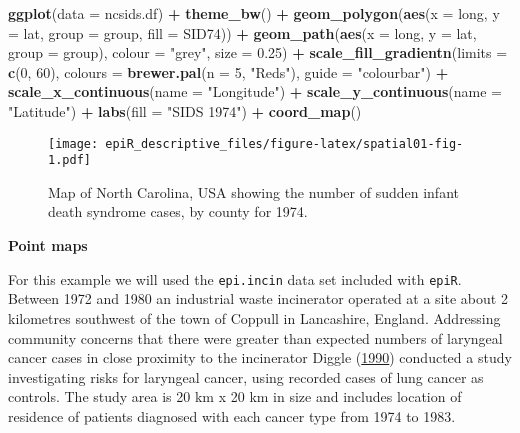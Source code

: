 \documentclass[
]{article}
\newenvironment{Shaded}{\begin{snugshade}}{\end{snugshade}}
\newcommand{\DataTypeTok}[1]{\textcolor[rgb]{0.13,0.29,0.53}{#1}}
\newcommand{\DecValTok}[1]{\textcolor[rgb]{0.00,0.00,0.81}{#1}}
\newcommand{\FloatTok}[1]{\textcolor[rgb]{0.00,0.00,0.81}{#1}}
\newcommand{\KeywordTok}[1]{\textcolor[rgb]{0.13,0.29,0.53}{\textbf{#1}}}
\newcommand{\NormalTok}[1]{#1}
\newcommand{\OperatorTok}[1]{\textcolor[rgb]{0.81,0.36,0.00}{\textbf{#1}}}
\newcommand{\StringTok}[1]{\textcolor[rgb]{0.31,0.60,0.02}{#1}}
\begin{document}
\begin{Shaded}
\begin{Highlighting}[]

\KeywordTok{ggplot}\NormalTok{(}\DataTypeTok{data =}\NormalTok{ ncsids.df) }\OperatorTok{+}\StringTok{ }
\StringTok{  }\KeywordTok{theme\_bw}\NormalTok{() }\OperatorTok{+}
\StringTok{  }\KeywordTok{geom\_polygon}\NormalTok{(}\KeywordTok{aes}\NormalTok{(}\DataTypeTok{x =}\NormalTok{ long, }\DataTypeTok{y =}\NormalTok{ lat, }\DataTypeTok{group =}\NormalTok{ group, }\DataTypeTok{fill =}\NormalTok{ SID74)) }\OperatorTok{+}\StringTok{ }
\StringTok{  }\KeywordTok{geom\_path}\NormalTok{(}\KeywordTok{aes}\NormalTok{(}\DataTypeTok{x =}\NormalTok{ long, }\DataTypeTok{y =}\NormalTok{ lat, }\DataTypeTok{group =}\NormalTok{ group), }\DataTypeTok{colour =} \StringTok{"grey"}\NormalTok{, }\DataTypeTok{size =} \FloatTok{0.25}\NormalTok{) }\OperatorTok{+}
\StringTok{  }\KeywordTok{scale\_fill\_gradientn}\NormalTok{(}\DataTypeTok{limits =} \KeywordTok{c}\NormalTok{(}\DecValTok{0}\NormalTok{, }\DecValTok{60}\NormalTok{), }\DataTypeTok{colours =} \KeywordTok{brewer.pal}\NormalTok{(}\DataTypeTok{n =} \DecValTok{5}\NormalTok{, }\StringTok{"Reds"}\NormalTok{), }
     \DataTypeTok{guide =} \StringTok{"colourbar"}\NormalTok{) }\OperatorTok{+}
\StringTok{  }\KeywordTok{scale\_x\_continuous}\NormalTok{(}\DataTypeTok{name =} \StringTok{"Longitude"}\NormalTok{) }\OperatorTok{+}
\StringTok{  }\KeywordTok{scale\_y\_continuous}\NormalTok{(}\DataTypeTok{name =} \StringTok{"Latitude"}\NormalTok{) }\OperatorTok{+}
\StringTok{  }\KeywordTok{labs}\NormalTok{(}\DataTypeTok{fill =} \StringTok{"SIDS 1974"}\NormalTok{) }\OperatorTok{+}
\StringTok{  }\KeywordTok{coord\_map}\NormalTok{()}
\end{Highlighting}
\end{Shaded}

\begin{figure}
\centering
\texttt{[image: epiR\_descriptive\_files/figure-latex/spatial01-fig-1.pdf]}
\caption{\label{fig:spatial01}Map of North Carolina, USA showing the
number of sudden infant death syndrome cases, by county for 1974.}
\end{figure}

\textbf{Point maps}

For this example we will used the \texttt{epi.incin} data set included
with \texttt{epiR}. Between 1972 and 1980 an industrial waste
incinerator operated at a site about 2 kilometres southwest of the town
of Coppull in Lancashire, England. Addressing community concerns that
there were greater than expected numbers of laryngeal cancer cases in
close proximity to the incinerator Diggle
(\protect\hyperlink{ref-diggle:1990}{1990}) conducted a study
investigating risks for laryngeal cancer, using recorded cases of lung
cancer as controls. The study area is 20 km x 20 km in size and includes
location of residence of patients diagnosed with each cancer type from
1974 to 1983.
\end{document}
